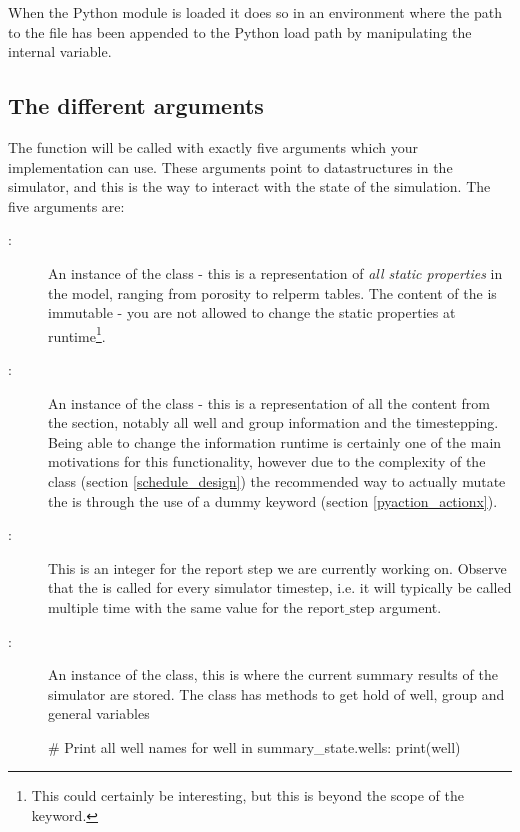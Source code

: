 When the Python module is loaded it does so in an environment where the path to
the  file has been appended to the Python load path by manipulating
the internal  variable.

 
\subsection{The different arguments}
The  function will be called with exactly five arguments which
your implementation can use. These arguments point to datastructures in the
simulator, and this is the way to interact with the state of the simulation. The
five arguments are:
\begin{description}
\item[:] An instance of the 
  class - this is a representation of \emph{all static properties} in the model,
  ranging from porosity to relperm tables. The content of the
   is immutable - you are not allowed to change the static
  properties at runtime\footnote{This could certainly be interesting, but this
  is beyond the scope of the \pyaction{} keyword.}.
\item[:] An instance of the 
  class - this is a representation of all the content from the 
  section, notably all well and group information and the timestepping. Being
  able to change the  information runtime is certainly one of the
  main motivations for this functionality, however due to the complexity of
  the  class (section \ref{schedule_design})
  the recommended way to actually mutate the  is
  through the use of a dummy \actionx{} keyword (section
  \ref{pyaction_actionx}).
\item[:] This is an integer for the report step we
  are currently working on. Observe that the \pyaction{} is called for every
  simulator timestep, i.e. it will typically be called multiple time with
  the same value for the $\mathrm{report\_step}$ argument.
\item[:] An instance of the
   class, this is where the current summary
  results of the simulator are stored. The  class has
  methods to get hold of well, group and general variables
  \begin{code}
    # Print all well names
    for well in summary_state.wells:
        print(well)


\end{code}
\end{description}
